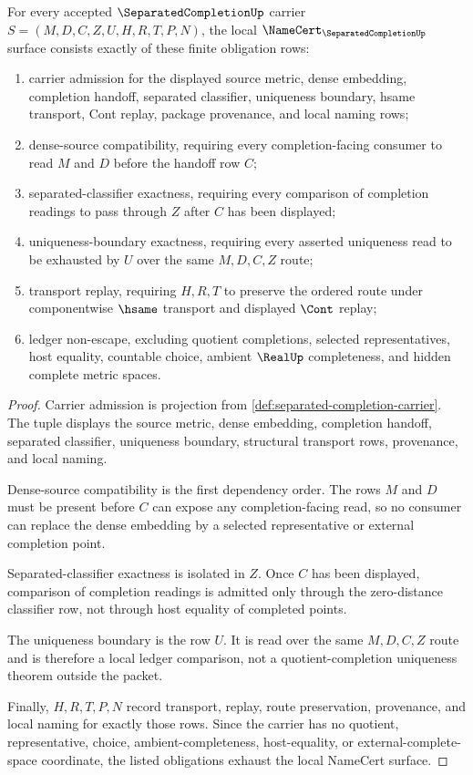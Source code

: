 \begin{theorem}
\label{thm:separated-completion-namecert-obligations}
For every accepted $\SeparatedCompletionUp$ carrier $S=(M,D,C,Z,U,H,R,T,P,N)$, the local $\NameCert_{\SeparatedCompletionUp}$ surface consists exactly of these finite obligation rows:
\begin{enumerate}
\item carrier admission for the displayed source metric, dense embedding, completion handoff, separated classifier, uniqueness boundary, hsame transport, Cont replay, package provenance, and local naming rows;
\item dense-source compatibility, requiring every completion-facing consumer to read $M$ and $D$ before the handoff row $C$;
\item separated-classifier exactness, requiring every comparison of completion readings to pass through $Z$ after $C$ has been displayed;
\item uniqueness-boundary exactness, requiring every asserted uniqueness read to be exhausted by $U$ over the same $M,D,C,Z$ route;
\item transport replay, requiring $H,R,T$ to preserve the ordered route under componentwise $\hsame$ transport and displayed $\Cont$ replay;
\item ledger non-escape, excluding quotient completions, selected representatives, host equality, countable choice, ambient $\RealUp$ completeness, and hidden complete metric spaces.
\end{enumerate}
\end{theorem}
\begin{proof}
Carrier admission is projection from \autoref{def:separated-completion-carrier}. The tuple displays the source metric, dense embedding, completion handoff, separated classifier, uniqueness boundary, structural transport rows, provenance, and local naming.

Dense-source compatibility is the first dependency order. The rows $M$ and $D$ must be present before $C$ can expose any completion-facing read, so no consumer can replace the dense embedding by a selected representative or external completion point.

Separated-classifier exactness is isolated in $Z$. Once $C$ has been displayed, comparison of completion readings is admitted only through the zero-distance classifier row, not through host equality of completed points.

The uniqueness boundary is the row $U$. It is read over the same $M,D,C,Z$ route and is therefore a local ledger comparison, not a quotient-completion uniqueness theorem outside the packet.

Finally, $H,R,T,P,N$ record transport, replay, route preservation, provenance, and local naming for exactly those rows. Since the carrier has no quotient, representative, choice, ambient-completeness, host-equality, or external-complete-space coordinate, the listed obligations exhaust the local NameCert surface.
\end{proof}

